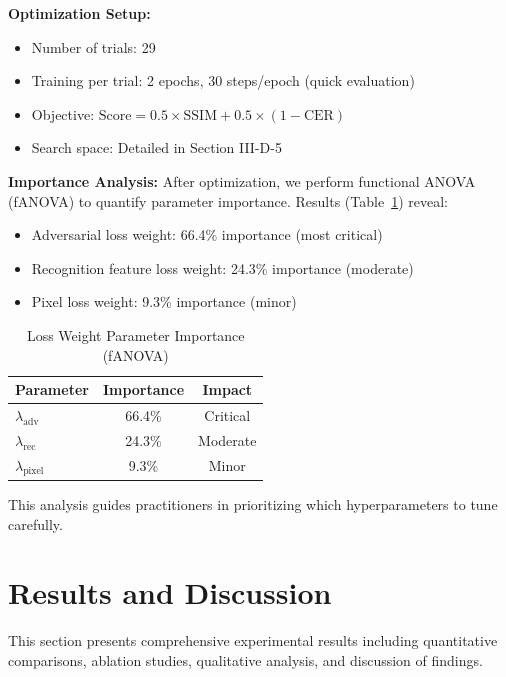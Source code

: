 \documentclass[journal]{IEEEtran}
\begin{document}
\textbf{Optimization Setup:}
\begin{itemize}
    \item Number of trials: 29
    \item Training per trial: 2 epochs, 30 steps/epoch (quick evaluation)
    \item Objective: $\text{Score} = 0.5 \times \text{SSIM} + 0.5 \times (1 - \text{CER})$
    \item Search space: Detailed in Section III-D-5
\end{itemize}

\textbf{Importance Analysis:} After optimization, we perform functional ANOVA (fANOVA) to quantify parameter importance. Results (Table~\ref{table_param_importance}) reveal:
\begin{itemize}
    \item Adversarial loss weight: 66.4\% importance (most critical)
    \item Recognition feature loss weight: 24.3\% importance (moderate)
    \item Pixel loss weight: 9.3\% importance (minor)
\end{itemize}

\begin{table}[!t]
\renewcommand{\arraystretch}{1.3}
\caption{Loss Weight Parameter Importance (fANOVA)}
\label{table_param_importance}
\centering
\begin{tabular}{|l|c|c|}
\hline
\textbf{Parameter} & \textbf{Importance} & \textbf{Impact} \\
\hline
$\lambda_{\text{adv}}$ & 66.4\% & Critical \\
$\lambda_{\text{rec}}$ & 24.3\% & Moderate \\
$\lambda_{\text{pixel}}$ & 9.3\% & Minor \\
\hline
\end{tabular}
\end{table}

This analysis guides practitioners in prioritizing which hyperparameters to tune carefully.

\section{Results and Discussion}

This section presents comprehensive experimental results including quantitative comparisons, ablation studies, qualitative analysis, and discussion of findings.
\end{document}
